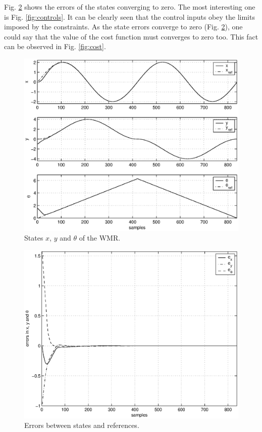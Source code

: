 \documentclass[twocolumn]{IEEEtran} %
\begin{document}
Fig. \ref{fig:errors} shows the errors of the states converging to zero. The most interesting one is Fig. \ref{fig:controls}. It can be clearly seen that the control inputs obey the limits imposed by the constraints. As the state errors converge to zero (Fig. \ref{fig:errors}), one could say that the value of the cost function must converges to zero too. This fact can be observed in Fig. \ref{fig:cost}.
\begin{figure}\begin{center}
    \includegraphics[width=.99\linewidth]{Figures/states.eps}
    \caption{States $x$, $y$ and $\theta$ of the WMR.}
    \label{fig:states}
\end{center}\end{figure}
\begin{figure}\begin{center}
    \includegraphics[width=.99\linewidth]{Figures/errors.eps}
    \caption{Errors between states and references.}
    \label{fig:errors}
\end{center}\end{figure}
\end{document}
